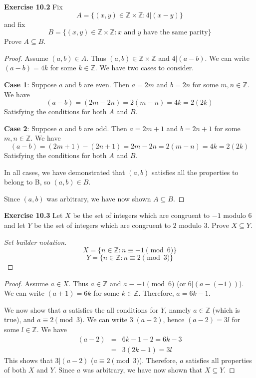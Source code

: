 \documentclass[12pt,oneside]{article}
\newenvironment{exercise}[1]{\vspace{.1in}\noindent\textbf{Exercise #1 \hspace{.05em}}}{}
\newcommand{\Z}{\mathbb{Z}}
\renewcommand{\mod}[3]{#1 \equiv #2 \pmod{#3}}
\begin{document}

\begin{exercise}{10.2}
Fix
\[A = \{(x,y) \in \Z \times \Z : 4|(x - y)\}\]
and fix
\[B=\{(x,y) \in \Z \times \Z : x \text{ and } y \text{ have the same parity}\}\]
Prove $A \subseteq B$.
\end{exercise}

\begin{proof}
Assume $(a,b) \in A$. Thus $(a,b) \in \Z \times \Z$ and $4|(a-b)$. We can write $(a-b) = 4k$ for some $k \in \Z$. We have two cases to consider.

\textbf{Case 1}: Suppose $a$ and $b$ are even. Then $a = 2m$ and $b = 2n$ for some $m,n \in \Z$. We have
\[(a-b)=(2m - 2n) = 2(m - n) = 4k = 2(2k)\] 
Satisfying the conditions for both $A$ and $B$.

\textbf{Case 2}: Suppose $a$ and $b$ are odd. Then $a = 2m + 1$ and $b = 2n + 1$ for some $m,n \in \Z$. We have
\[(a-b)=(2m + 1) - (2n + 1) = 2m - 2n = 2(m - n) = 4k = 2(2k)\]
Satisfying the conditions for both $A$ and $B$.

In all cases, we have demonstrated that $(a,b)$ satisfies all the properties to belong to B, so $(a,b) \in B$.

Since $(a,b)$ was arbitrary, we have now shown $A \subseteq B$.
\end{proof}



\begin{exercise}{10.3}
Let $X$ be the set of integers which are congruent to $-1$ modulo 6 and let $Y$ be the set of integers which are congruent to $2$ modulo $3$. Prove $X \subseteq Y$.
\end{exercise}

\begin{proof}[Set builder notation]
\[X = \{n \in \Z : \mod{n}{-1}{6}\}\]
\[Y = \{n \in \Z : \mod{n}{2}{3}\}\]
\end{proof}

\begin{proof}
Assume $a \in X$. Thus $a \in \Z$ and $\mod{a}{-1}{6}$ (or $6|(a - (-1))$). We can write $(a + 1) = 6k$ for some $k \in \Z$. Therefore, $a = 6k - 1$. 

We now show that $a$ satisfies the all conditions for $Y$, namely $a \in \Z$ (which is true), and $\mod{a}{2}{3}$. We can write $3|(a-2)$, hence $(a - 2) = 3l$ for some $l \in \Z$. We have
\begin{eqnarray*}
(a - 2) &=& 6k - 1 - 2 = 6k - 3 \\
        &=& 3(2k - 1) = 3l
\end{eqnarray*}
This shows that $3|(a-2)$ ($\mod{a}{2}{3}$). Therefore, $a$ satisfies all properties of both $X$ and $Y$. Since $a$ was arbitrary, we have now shown that $X \subseteq Y$.
\end{proof}
\end{document}
